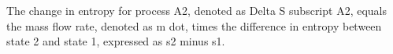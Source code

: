 The change in entropy for process A2, denoted as Delta S subscript A2, equals the mass flow rate, denoted as m dot, times the difference in entropy between state 2 and state 1, expressed as s2 minus s1.